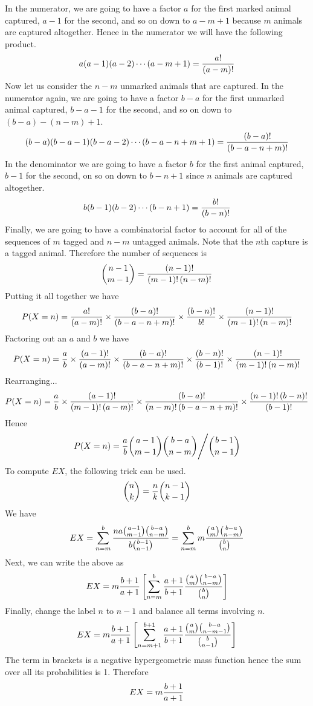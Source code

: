 \bigskip
\noindent
In the numerator, we are going to have a factor $a$ for the first
marked animal captured, $a-1$ for the second, and so on down to
$a-m+1$ because $m$ animals are captured altogether.
Hence in the numerator we will have the following product.
$$a(a-1)(a-2)\cdots(a-m+1)={a!\over(a-m)!}$$
Now let us consider the $n-m$ unmarked animals that are captured.
In the numerator again, we are going to have a factor
$b-a$ for the first
unmarked animal captured, $b-a-1$ for the second, and so on down
to $(b-a)-(n-m)+1$.
$$(b-a)(b-a-1)(b-a-2)\cdots(b-a-n+m+1)={(b-a)!\over(b-a-n+m)!}$$
In the denominator we are going to have a factor $b$ for the first
animal captured, $b-1$ for the second, on so on down to $b-n+1$
since $n$ animals are captured altogether.
$$b(b-1)(b-2)\cdots(b-n+1)={b!\over (b-n)!}$$
Finally, we are going to have a combinatorial factor to account
for all of the sequences of $m$ tagged and $n-m$ untagged animals.
Note that the $n$th capture is a tagged animal.
Therefore the number of sequences is
$${n-1\choose m-1}={(n-1)!\over(m-1)!\,(n-m)!}$$
Putting it all together we have
$$P(X=n)={a!\over(a-m)!}
\times{(b-a)!\over(b-a-n+m)!}
\times{(b-n)!\over b!}
\times{(n-1)!\over(m-1)!\,(n-m)!}
$$
Factoring out an $a$ and $b$ we have
$$P(X=n)={a\over b}
\times{(a-1)!\over(a-m)!}
\times{(b-a)!\over(b-a-n+m)!}
\times{(b-n)!\over(b-1)!}
\times{(n-1)!\over(m-1)!\,(n-m)!}
$$
Rearranging...
$$P(X=n)={a\over b}
\times{(a-1)!\over(m-1)!\,(a-m)!}
\times{(b-a)!\over(n-m)!\,(b-a-n+m)!}
\times{(n-1)!\,(b-n)!\over(b-1)!}
$$
Hence
$$P(X=n)={a\over b}
{a-1\choose m-1}
{b-a\choose n-m}
\Bigg/
{b-1\choose n-1}
$$
To compute $EX$, the following trick can be used.
$${n\choose k}={n\over k}{n-1\choose k-1}$$
We have
$$EX=\sum_{n=m}^b{na{a-1\choose m-1}{b-a\choose n-m}
\over b{b-1\choose n-1}}
=\sum_{n=m}^bm{{a\choose m}{b-a\choose n-m}\over{b\choose n}}$$
Next, we can write the above as
$$
EX=m{b+1\over a+1}\left[\sum_{n=m}^b{a+1\over b+1}
{{a\choose m}{b-a\choose n-m}\over{b\choose n}}\right]
$$
Finally, change the label $n$ to $n-1$ and balance all terms
involving $n$.
$$
EX=m{b+1\over a+1}\left[\sum_{n=m+1}^{b+1}{a+1\over b+1}
{{a\choose m}{b-a\choose n-m-1}\over{b\choose n-1}}\right]
$$
The term in brackets is a negative hypergeometric mass function
hence the sum over all its probabilities is 1.
Therefore
$$EX=m{b+1\over a+1}$$

